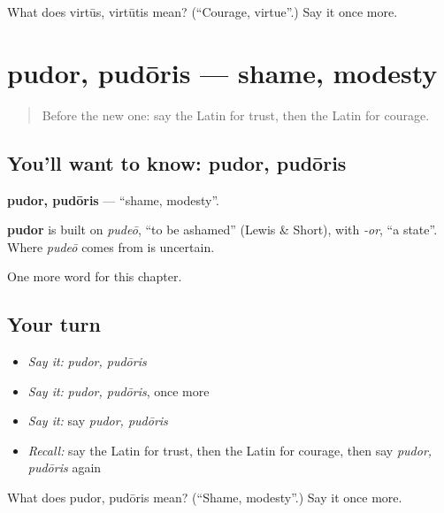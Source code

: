 \begin{tcolorbox}[breakable,colback=teal!4,colframe=teal!35!black,title={Before you move on}]
What does virtūs, virtūtis mean? (\textquotedblleft{}Courage, virtue\textquotedblright{}.) Say it once more.
\end{tcolorbox}
\section[pudor, pudōris]{pudor, pudōris — shame, modesty}

\label{lesson:LA-C262-pudor}



\begin{quote}
Before the new one: say the Latin for trust, then the Latin for courage.
\end{quote}

\subsection*{You'll want to know: pudor, pudōris}
\textbf{pudor, pudōris} — \textquotedblleft{}shame, modesty\textquotedblright{}.

\begin{cousinweb}
\textbf{pudor} is built on \emph{pudeō}, \textquotedblleft{}to be ashamed\textquotedblright{} (Lewis \& Short), with \emph{-or}, \textquotedblleft{}a state\textquotedblright{}. Where \emph{pudeō} comes from is uncertain.
\end{cousinweb}

\begin{grammarlens}[title={What you've built}]
One more word for this chapter.
\end{grammarlens}

\subsection*{Your turn}
\begin{itemize}
\raggedright
  \item \emph{Say it:} \emph{pudor, pudōris}
  \item \emph{Say it:} \emph{pudor, pudōris}, once more
  \item \emph{Say it:} say \emph{pudor, pudōris}
  \item \emph{Recall:} say the Latin for trust, then the Latin for courage, then say \emph{pudor, pudōris} again
\end{itemize}

\begin{tcolorbox}[breakable,colback=teal!4,colframe=teal!35!black,title={Before you move on}]
What does pudor, pudōris mean? (\textquotedblleft{}Shame, modesty\textquotedblright{}.) Say it once more.
\end{tcolorbox}
